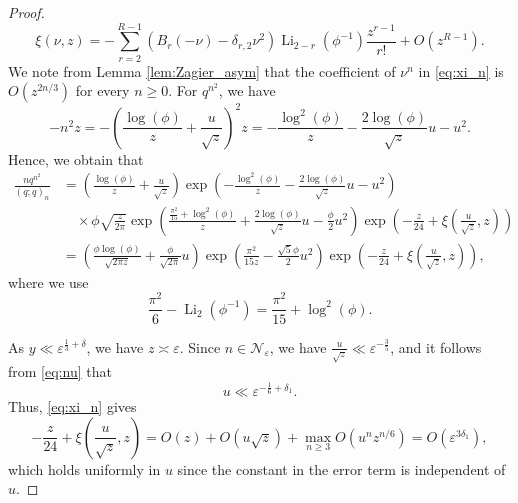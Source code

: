 \documentclass[11pt,reqno]{amsart}
\theoremstyle{remark}
\numberwithin{equation}{section}
\def\Li{\operatorname{Li}}
\def\Li{\operatorname{Li}}
\begin{document}
\begin{proof}
\begin{equation}\label{eq:xi_n}
	\xi(\nu, z) = -\sum_{r=2}^{R-1} \left( B_r(-\nu)-\delta_{r,2} \nu^2 \right) \Li_{2-r}(\phi^{-1}) \frac{z^{r-1}}{r!} + O\left( z^{R-1} \right).
\end{equation}
We note from Lemma \ref{lem:Zagier_asym} that the coefficient of $\nu^n$ in \eqref{eq:xi_n} is $O\left(z^{2n/3} \right)$ for every $n \geq 0$. For $q^{n^2}$, we have
\[
	-n^2 z = - \left( \frac{\log (\phi)}{z} + \frac{u}{\sqrt{z}} \right)^2 z = - \frac{\log^2 (\phi)}{z}  - \frac{2\log (\phi)}{\sqrt{z}}u  - u^2.
\]
Hence, we obtain that
\begin{align*}
	\frac{n q^{n^2}}{(q;q)_n} 
	&=\left( \frac{\log (\phi)}{z} + \frac{u}{\sqrt{z}}  \right) \exp\left(  - \frac{\log^2 (\phi)}{z}  - \frac{2\log (\phi)}{\sqrt{z}}u  - u^2 \right) \\
	&\quad \times\phi \sqrt{\frac{z}{2\pi}}  \exp \left( \frac{\frac{\pi^2}{15}+\log^2(\phi)}{z} + \frac{2\log(\phi)}{\sqrt{z}}u -  \frac{\phi}{2} u^2  \right) \exp\left(-\frac{z}{24} + \xi \left(\frac{u}{\sqrt{z}}, z\right) \right)\\
	&=  \left( \frac{\phi \log(\phi) }{\sqrt{2\pi z}} + \frac{\phi}{\sqrt{2\pi}} u\right) \exp \left( \frac{\pi^2}{15z} - \frac{\sqrt{5}\phi}{2}  u^2   \right) \exp\left(-\frac{z}{24} + \xi \left( \frac{u}{\sqrt{z}}, z\right) \right),
\end{align*}
where we use
\[
	\frac{\pi^2}{6} - \Li_2 (\phi^{-1}) = \frac{\pi^2}{15} + \log^2(\phi).
\]


As $y \ll \varepsilon^{\frac13+\delta}$, we have $z \asymp \varepsilon$. Since $n \in \mathcal{N}_{\varepsilon}$, we have $\frac{u}{\sqrt{z}} \ll \varepsilon^{-\frac35}$, and it follows from \eqref{eq:nu} that 
\begin{equation}\label{eq:u_bound}
	u \ll \varepsilon^{-\frac16+\delta_1}.
\end{equation}
Thus, \eqref{eq:xi_n} gives
\[
	-\frac{z}{24} + \xi \left( \frac{u}{\sqrt{z}}, z\right) =  O(z) + O\left(u\sqrt{z}\right) + \max_{n \geq 3} O\left(u^n z^{n/6}\right) =O\left(\varepsilon^{3\delta_1}\right),
\]
which holds uniformly in $u$ since the constant in the error term is independent of $u$.



\end{proof}
\end{document}
